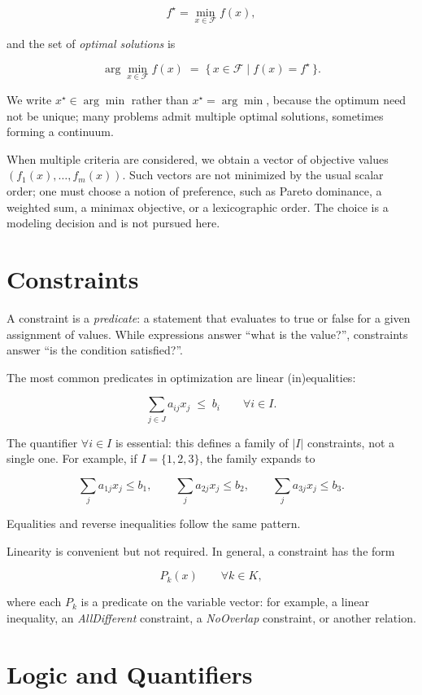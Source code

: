 \[
f^\star = \min_{x \in \mathcal{F}} f(x),
\]

and the set of \emph{optimal solutions} is

\[
\arg\min_{x \in \mathcal{F}} f(x) \;=\; \{\, x \in \mathcal{F} \mid f(x) = f^\star \,\}.
\]

We write \(x^\star \in \arg\min\) rather than \(x^\star = \arg\min\),
because the optimum need not be unique; many problems admit multiple
optimal solutions, sometimes forming a continuum.

When multiple criteria are considered, we obtain a vector of objective
values \((f_1(x), \dots, f_m(x))\). Such vectors are not minimized by
the usual scalar order; one must choose a notion of preference, such as
Pareto dominance, a weighted sum, a minimax objective, or a
lexicographic order. The choice is a modeling decision and is not
pursued here.

\section{Constraints}\label{sec:2.7}

A constraint is a \emph{predicate}: a statement that evaluates to true
or false for a given assignment of values. While expressions answer
``what is the value?'', constraints answer ``is the condition
satisfied?''.

The most common predicates in optimization are linear (in)equalities:

\[
\sum_{j \in J} a_{ij} x_j \;\le\; b_i \qquad \forall i \in I.
\]

The quantifier \(\forall i \in I\) is essential: this defines a family
of \(|I|\) constraints, not a single one. For example, if
\(I = \{1,2,3\}\), the family expands to

\[
\sum_j a_{1j} x_j \le b_1, \qquad \sum_j a_{2j} x_j \le b_2, \qquad \sum_j a_{3j} x_j \le b_3.
\]

Equalities and reverse inequalities follow the same pattern.

Linearity is convenient but not required. In general, a constraint has
the form

\[
P_k(x) \qquad \forall k \in K,
\]

where each \(P_k\) is a predicate on the variable vector: for example,
a linear inequality, an \emph{AllDifferent} constraint, a
\emph{NoOverlap} constraint, or another relation.

\section{Logic and Quantifiers}\label{sec:2.8}

